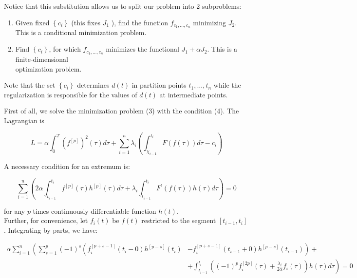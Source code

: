 \documentclass[10pt]{article}
\begin{document}
Notice that this substitution allows us to split our problem into 2 subproblems:

\begin{enumerate}
  \item Given fixed $\left\{c_{i}\right\}$ (this fixes $J_{1}$ ), find the function $f_{c_{1}, \ldots, c_{n}}$ minimizing $J_{2}$. This is a conditional minimization problem.
  \item Find $\left\{c_{i}\right\}$, for which $f_{c_{1}, \ldots, c_{n}}$ minimizes the functional $J_{1}+\alpha J_{2}$. This is a finite-dimensional\\
optimization problem.
\end{enumerate}

Note that the set $\left\{c_{i}\right\}$ determines $d(t)$ in partition points $t_{1}, \ldots, t_{n}$ while the regularization is responsible for the values of $d(t)$ at intermediate points.

First of all, we solve the minimization problem (3) with the condition (4). The Lagrangian is


\begin{equation*}
L=\alpha \int_{0}^{T}\left(f^{[p]}\right)^{2}(\tau) d \tau+\sum_{i=1}^{n} \lambda_{i}\left(\int_{\chi_{i-1}}^{t_{i}} F(f(\tau)) d \tau-c_{i}\right) \tag{5}
\end{equation*}


A necessary condition for an extremum is:


\begin{equation*}
\sum_{i=1}^{n}\left(2 \alpha \int_{t_{i-1}}^{t_{i}} f^{[p]}(\tau) h^{[p]}(\tau) d \tau+\lambda_{i} \int_{t_{i-1}}^{t_{i}} F^{\prime}(f(\tau)) h(\tau) d \tau\right)=0 \tag{6}
\end{equation*}


for any $p$ times continuously differentiable function $h(t)$.\\
Further, for convenience, let $f_{i}(t)$ be $f(t)$ restricted to the segment $\left[t_{i-1}, t_{i}\right]$. Integrating by parts, we have:


\begin{align*}
\alpha \sum_{i=1}^{n}\left(\sum _ { s = 1 } ^ { p } ( - 1 ) ^ { s } \left(f_{i}^{[p+s-1]}\left(t_{i}-0\right) h^{[p-s]}\left(t_{i}\right)\right.\right. & \left.-f_{i}^{[p+s-1]}\left(t_{i-1}+0\right) h^{[p-s]}\left(t_{i-1}\right)\right)+ \\
& \left.+\int_{t_{i-1}}^{t_{i}}\left((-1)^{p} f_{i}^{[2 p]}(\tau)+\frac{\lambda_{i}}{2 \alpha} f_{i}(\tau)\right) h(\tau) d \tau\right)=0 \tag{7}
\end{align*}
\end{document}
